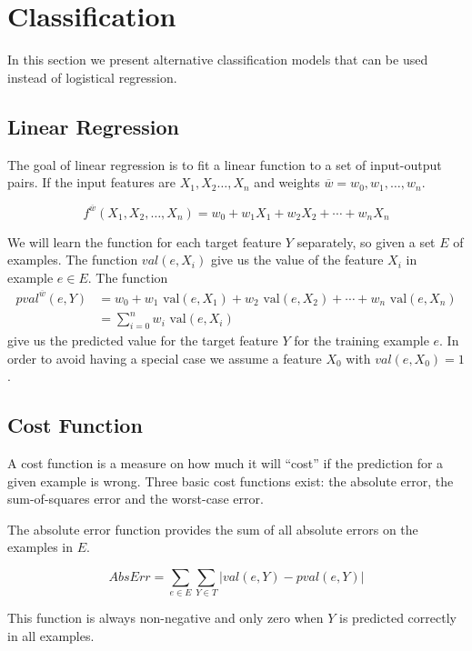 \section{Classification}\label{sec:classification}
In this section we present alternative classification models that can be used instead of logistical regression.


\subsection{Linear Regression}\label{sec:linreg}
The goal of linear regression is to fit a linear function to a set of input-output pairs. 
If the input features are $X_1,X_2 \dots, X_n$ and weights $\overline{w} = w_0, w_1, \dots, w_n$.

\[f^{\overline{w}}(X_1,X_2, \dots, X_n) = w_0 + w_1 X_1 + w_2 X_2 + \cdots + w_n X_n \]

We will learn the function for each target feature $Y$ separately, so given a set $E$ of examples.
The function $val(e,X_i)$ give us the value of the feature $X_i$ in example $e \in E$. The function 
\begin{align*}
pval^{\overline{w}}(e,Y) &= w_0 + w_1 \text{ val}(e,X_1) + w_2 \text{ val}(e,X_2) + \cdots + w_n \text{ val}(e,X_n) \\
&= \sum^n_{i=0} w_i \text{ val}(e,X_i)
\end{align*}
give us the predicted value for the target feature $Y$ for the training example $e$.
In order to avoid having a special case we assume a feature $X_0$ with $val(e,X_0)=1$.~\cite[p. 304]{AI2010}


\subsection{Cost Function}\label{sec:costfun}
A cost function is a measure on how much it will ``cost'' if the prediction for a given example is wrong.
Three basic cost functions exist: the absolute error, the sum-of-squares error and 
the worst-case error.

The absolute error function provides the sum of all absolute errors on the examples in $E$.

\[AbsErr = \sum_{e \in E}\sum_{Y \in T} |val(e,Y) - pval(e,Y)|\]

This function is always non-negative and only zero when $Y$ is predicted correctly in all examples. 

